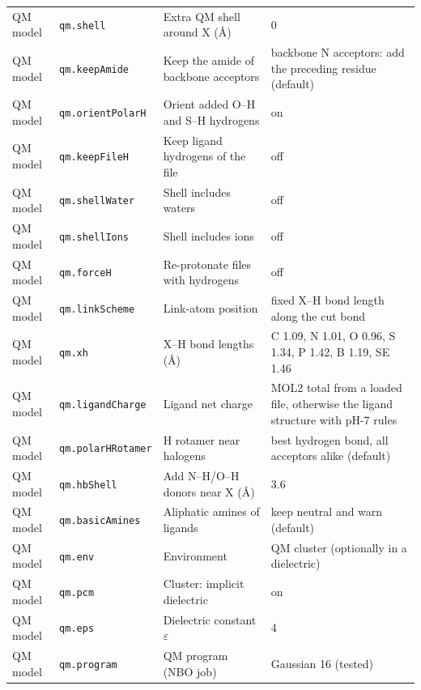 \documentclass[journal=jcisd8,manuscript=suppinfo]{achemso}
\begin{document}
\begin{singlespace}
{\begin{longtable}{llp{4.2cm}l}
QM model & \texttt{qm.shell} & Extra QM shell around X (\AA{}) & \parbox[t]{5.0cm}{\raggedright 0}\\
QM model & \texttt{qm.keepAmide} & Keep the amide of backbone acceptors & \parbox[t]{5.0cm}{\raggedright backbone N acceptors: add the preceding residue (default)}\\
QM model & \texttt{qm.orientPolarH} & Orient added O--H and S--H hydrogens & \parbox[t]{5.0cm}{\raggedright on}\\
QM model & \texttt{qm.keepFileH} & Keep ligand hydrogens of the file & \parbox[t]{5.0cm}{\raggedright off}\\
QM model & \texttt{qm.shellWater} & Shell includes waters & \parbox[t]{5.0cm}{\raggedright off}\\
QM model & \texttt{qm.shellIons} & Shell includes ions & \parbox[t]{5.0cm}{\raggedright off}\\
QM model & \texttt{qm.forceH} & Re-protonate files with hydrogens & \parbox[t]{5.0cm}{\raggedright off}\\
QM model & \texttt{qm.linkScheme} & Link-atom position & \parbox[t]{5.0cm}{\raggedright fixed X--H bond length along the cut bond}\\
QM model & \texttt{qm.xh} & X--H bond lengths (\AA{}) & \parbox[t]{5.0cm}{\raggedright C 1.09, N 1.01, O 0.96, S 1.34, P 1.42, B 1.19, SE 1.46}\\
QM model & \texttt{qm.ligandCharge} & Ligand net charge & \parbox[t]{5.0cm}{\raggedright MOL2 total from a loaded file, otherwise the ligand structure with pH-7 rules}\\
QM model & \texttt{qm.polarHRotamer} & H rotamer near halogens & \parbox[t]{5.0cm}{\raggedright best hydrogen bond, all acceptors alike (default)}\\
QM model & \texttt{qm.hbShell} & Add N--H/O--H donors near X (\AA{}) & \parbox[t]{5.0cm}{\raggedright 3.6}\\
QM model & \texttt{qm.basicAmines} & Aliphatic amines of ligands & \parbox[t]{5.0cm}{\raggedright keep neutral and warn (default)}\\
QM model & \texttt{qm.env} & Environment & \parbox[t]{5.0cm}{\raggedright QM cluster (optionally in a dielectric)}\\
QM model & \texttt{qm.pcm} & Cluster: implicit dielectric & \parbox[t]{5.0cm}{\raggedright on}\\
QM model & \texttt{qm.eps} & Dielectric constant $\varepsilon$ & \parbox[t]{5.0cm}{\raggedright 4}\\
QM model & \texttt{qm.program} & QM program (NBO job) & \parbox[t]{5.0cm}{\raggedright Gaussian 16 (tested)}\\

\end{longtable}}
\end{singlespace}
\end{document}
